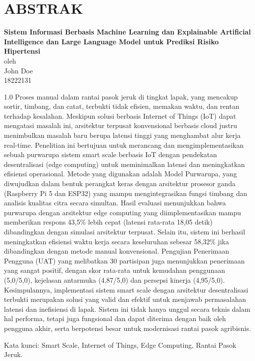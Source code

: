 \chapter*{ABSTRAK}

\begin{center}

    \textbf{Sistem Informasi Berbasis Machine Learning dan Explainable Artificial Intelligence dan Large Language Model untuk Prediksi Risiko Hipertensi} \\
    \vspace{0.4cm}
    oleh \\
    \vspace{0.4cm}
    John Doe\\
    18222131\\
\end{center}


\begin{spacing}{1.0}
Proses manual dalam rantai pasok jeruk di tingkat lapak, yang mencakup sortir,
timbang, dan catat, terbukti tidak efisien, memakan waktu, dan rentan terhadap
kesalahan. Meskipun solusi berbasis Internet of Things (IoT) dapat mengatasi
masalah ini, arsitektur terpusat konvensional berbasis cloud justru menimbulkan
masalah baru berupa latensi tinggi yang menghambat alur kerja real-time.
Penelitian ini bertujuan untuk merancang dan mengimplementasikan sebuah
purwarupa sistem smart scale berbasis IoT dengan pendekatan desentralisasi (edge
computing) untuk meminimalkan latensi dan meningkatkan efisiensi operasional.
Metode yang digunakan adalah Model Purwarupa, yang diwujudkan dalam bentuk
perangkat keras dengan arsitektur prosesor ganda (Raspberry Pi 5 dan ESP32) yang
mampu mengintegrasikan fungsi timbang dan analisis kualitas citra secara
simultan. Hasil evaluasi menunjukkan bahwa purwarupa dengan arsitektur edge
computing yang diimplementasikan mampu memberikan respons 43,5\% lebih cepat
(latensi rata-rata 18,05 detik) dibandingkan dengan simulasi arsitektur terpusat.
Selain itu, sistem ini berhasil meningkatkan efisiensi waktu kerja secara
keseluruhan sebesar 58,32\% jika dibandingkan dengan metode manual
konvensional. Pengujian Penerimaan Pengguna (UAT) yang melibatkan 30
partisipan juga menunjukkan penerimaan yang sangat positif, dengan skor rata-rata
untuk kemudahan penggunaan (5,0/5,0), kejelasan antarmuka (4,87/5,0) dan
persepsi kinerja (4,95/5,0). Kesimpulannya, implementasi sistem smart scale
dengan arsitektur desentralisasi terbukti merupakan solusi yang valid dan efektif
untuk menjawab permasalahan latensi dan inefisiensi di lapak. Sistem ini tidak
hanya unggul secara teknis dalam hal performa, tetapi juga fungsional dan dapat
diterima dengan baik oleh pengguna akhir, serta berpotensi besar untuk modernisasi
rantai pasok agribisnis.

Kata kunci: Smart Scale, Internet of Things, Edge Computing, Rantai Pasok Jeruk.
\end{spacing}

